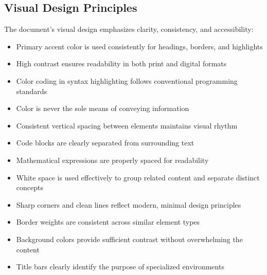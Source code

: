 \subsection*{Visual Design Principles}\label{subsec:visual-design-principles}

The document's visual design emphasizes clarity, consistency, and accessibility:

\begin{itemize}
    \item Primary accent color is used consistently for headings, borders, and highlights
    \item High contrast ensures readability in both print and digital formats
    \item Color coding in syntax highlighting follows conventional programming standards
    \item Color is never the sole means of conveying information
\end{itemize}

\begin{itemize}
    \item Consistent vertical spacing between elements maintains visual rhythm
    \item Code blocks are clearly separated from surrounding text
    \item Mathematical expressions are properly spaced for readability
    \item White space is used effectively to group related content and separate distinct concepts
\end{itemize}

\begin{itemize}
    \item Sharp corners and clean lines reflect modern, minimal design principles
    \item Border weights are consistent across similar element types
    \item Background colors provide sufficient contrast without overwhelming the content
    \item Title bars clearly identify the purpose of specialized environments
\end{itemize}

